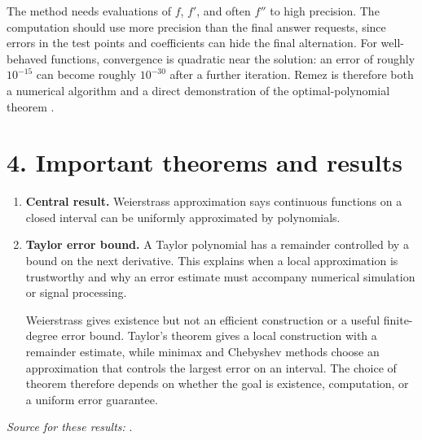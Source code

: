 The method needs evaluations of $f$, $f'$, and often $f''$ to high precision. The computation should use more precision than the final answer requests, since errors in the test points and coefficients can hide the final alternation. For well-behaved functions, convergence is quadratic near the solution: an error of roughly $10^{-15}$ can become roughly $10^{-30}$ after a further iteration. Remez is therefore both a numerical algorithm and a direct demonstration of the optimal-polynomial theorem \cite{approximation_theory_ref1,approximation_theory_ref6,approximation_theory_ref7}.

\section*{4. Important theorems and results}
\begin{enumerate}[leftmargin=*,itemsep=0.35em]
\item \textbf{Central result.} Weierstrass approximation says continuous functions on a closed interval can be uniformly approximated by polynomials.

\item \textbf{Taylor error bound.} A Taylor polynomial has a remainder controlled by a bound on the next derivative. This explains when a local approximation is trustworthy and why an error estimate must accompany numerical simulation or signal processing.

Weierstrass gives existence but not an efficient construction or a useful finite-degree error bound. Taylor's theorem gives a local construction with a remainder estimate, while minimax and Chebyshev methods choose an approximation that controls the largest error on an interval. The choice of theorem therefore depends on whether the goal is existence, computation, or a uniform error guarantee.\end{enumerate}
\noindent\emph{Source for these results:} \cite{approximation_theory_ref1}.

